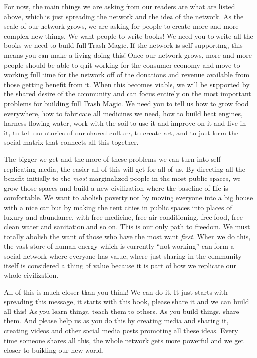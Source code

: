 For now, the main things we are asking from our readers are what are
listed above, which is just spreading the network and the idea of the
network. As the scale of our network grows, we are asking for people to
create more and more complex new things. We want people to write books!
We need you to write all the books we need to build full Trash Magic. If
the network is self-supporting, this means you can make a living doing
this! Once our network grows, more and more people should be able to
quit working for the consumer economy and move to working full time for
the network off of the donations and revenue available from those
getting benefit from it. When this becomes viable, we will be supported
by the shared desire of the community and can focus entirely on the most
important problems for building full Trash Magic. We need you to tell us
how to grow food everywhere, how to fabricate all medicines we need, how
to build heat engines, harness flowing water, work with the soil to use
it and improve on it and live in it, to tell our stories of our shared
culture, to create art, and to just form the social matrix that connects
all this together.

The bigger we get and the more of these problems we can turn into
self-replicating media, the easier all of this will get for all of us.
By directing all the benefit initially to the \emph{most} marginalized
people in the most public spaces, we grow those spaces and build a new
civilization where the baseline of life is comfortable. We want to
abolish poverty not by moving everyone into a big house with a nice car
but by making the tent cities in public spaces into places of luxury and
abundance, with free medicine, free air conditioning, free food, free
clean water and sanitation and so on. This is our only path to freedom.
We must totally abolish the want of those who have the most want
\emph{first}. When we do this, the vast store of human energy which is
currently ``not working'' can form a social network where everyone has
value, where just sharing in the community itself is considered a thing
of value because it is part of how we replicate our whole civilization.

All of this is much closer than you think! We can do it. It just starts
with spreading this message, it starts with this book, please share it
and we can build all this! As you learn things, teach them to others. As
you build things, share them. And please help us as you do this by
creating media and sharing it, creating videos and other social media
posts promoting all these ideas. Every time someone shares all this, the
whole network gets more powerful and we get closer to building our new
world.
